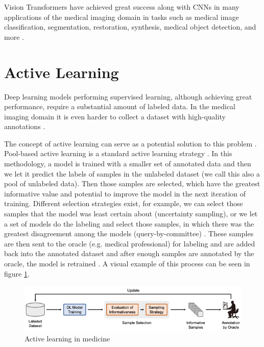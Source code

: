 Vision Transformers have achieved great success along with CNNs in many applications of the medical imaging domain in tasks such as medical image classification, segmentation, restoration, synthesis, medical object detection, and more \cite{Shamshad2023}.

\section{Active Learning}
Deep learning models performing supervised learning, although achieving great performance, require a substantial amount of labeled data. In the medical imaging domain it is even harder to collect a dataset with high-quality annotations \cite{Nath2021}. 

The concept of active learning can serve as a potential solution to this problem \cite{Nath2021, Wang2023}. Pool-based active learning is a standard active learning strategy \cite{Wang2023}. In this methodology, a model is trained with a smaller set of annotated data and then we let it predict the labels of samples in the unlabeled dataset (we call this also a pool of unlabeled data). Then those samples are selected, which have the greatest informative value and potential to improve the model in the next iteration of training. Different selection strategies exist, for example, we can select those samples that the model was least certain about (uncertainty sampling), or we let a set of models do the labeling and select those samples, in which there was the greatest disagreement among the models (query-by-committee) \cite{Wang2023}. These samples are then sent to the oracle (e.g. medical professional) for labeling and are added back into the annotated dataset and after enough samples are annotated by the oracle, the model is retrained \cite{Wang2023}. A visual example of this process can be seen in figure \ref{fig:active-learning}.

\begin{figure}[H]
    \begin{centering}
    \includegraphics[width=14cm]{assets/images/active-learning.png}
    \par\end{centering}
    \caption{Active learning in medicine \cite{Wang2023}}
    \label{fig:active-learning}
\end{figure}

